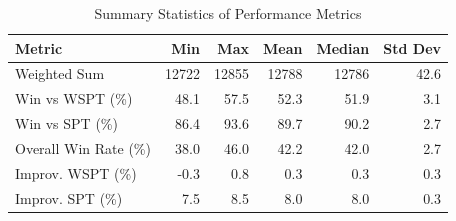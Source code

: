 \begin{table}[htbp]%
\centering%
\begin{tabular}{lrrrrr}%
\toprule%
\textbf{Metric}&\textbf{Min}&\textbf{Max}&\textbf{Mean}&\textbf{Median}&\textbf{Std Dev}\\%
\midrule%
Weighted Sum&12722&12855&12788&12786&42.6\\%
Win vs WSPT (\%)&48.1&57.5&52.3&51.9&3.1\\%
Win vs SPT (\%)&86.4&93.6&89.7&90.2&2.7\\%
Overall Win Rate (\%)&38.0&46.0&42.2&42.0&2.7\\%
Improv. WSPT (\%)&-0.3&0.8&0.3&0.3&0.3\\%
Improv. SPT (\%)&7.5&8.5&8.0&8.0&0.3\\%
\bottomrule%
\end{tabular}%
\caption{Summary Statistics of Performance Metrics}%
\label{tab:metrics}%
\end{table}